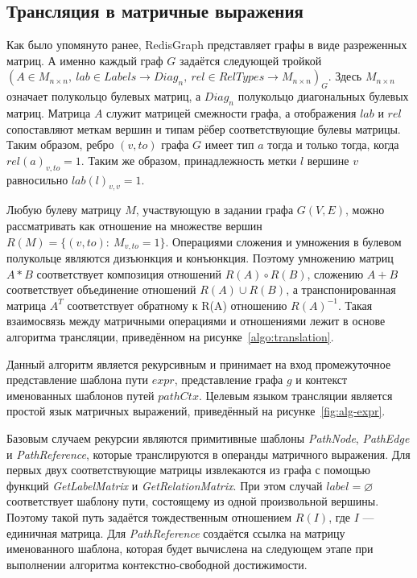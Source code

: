 \newpage
\subsection{Трансляция в матричные выражения}
Как было упомянуто ранее, RedisGraph представляет графы в виде разреженных матриц. А именно каждый граф $G$ задаётся следующей тройкой $(A \in M_{n\times n},~lab \in Labels \rightarrow Diag_n,~rel \in RelTypes \rightarrow M_{n \times n})_G$. Здесь $M_{n \times n}$ означает полукольцо булевых матриц, а $Diag_n$ полукольцо диагональных булевых матриц. Матрица $A$ служит матрицей смежности графа, а отображения $lab$ и $rel$ сопоставляют меткам вершин и типам рёбер соответствующие булевы матрицы. Таким образом, ребро $(v, to)$ графа $G$ имеет тип $a$ тогда и только тогда, когда $rel(a)_{v,to} = 1$.  Таким же образом, принадлежность метки $l$ вершине $v$ равносильно $lab(l)_{v,v}=1$.

Любую булеву матрицу $M$, участвующую в задании графа $G(V, E)$, можно рассматривать как отношение на множестве вершин $R(M) = \{(v, to):~M_{v,to}=1\}$. Операциями сложения и умножения в булевом полукольце являются дизъюнкция и конъюнкция. Поэтому умножению матриц $A*B$ соответствует композиция отношений $R(A) \circ R(B)$, сложению $A+B$ соответствует объединение отношений $R(A) \cup R(B)$, а транспонированная матрица $A^T$ соответствует обратному к R(A) отношению $R(A)^{-1}$. Такая взаимосвязь между матричными операциями и отношениями лежит в основе алгоритма трансляции, приведённом на рисунке~\ref{algo:translation}.

Данный алгоритм является рекурсивным и принимает на вход промежуточное представление шаблона пути $expr$, представление графа $g$ и контекст именованных шаблонов путей $pathCtx$. Целевым языком трансляции является простой язык матричных выражений, приведённый на рисунке~\ref{fig:alg-expr}.

Базовым случаем рекурсии являются примитивные шаблоны \textit{Path\-Node}, \textit{PathEdge} и \textit{PathReference}, которые транслируются в операнды матричного выражения. Для первых двух соответствующие матрицы извлекаются из графа с помощью функций \textit{GetLabel\-Matrix} и \textit{GetRelation\-Matrix}. При этом случай $label = \varnothing$ соответствует шаблону пути, состоящему из одной произвольной вершины. Поэтому такой путь задаётся тождественным отношением $R(I)$, где $I$ --- единичная матрица. Для \textit{Path\-Reference} создаётся ссылка на матрицу именованного шаблона, которая будет вычислена на следующем этапе при выполнении алгоритма контекстно-свободной достижимости.

